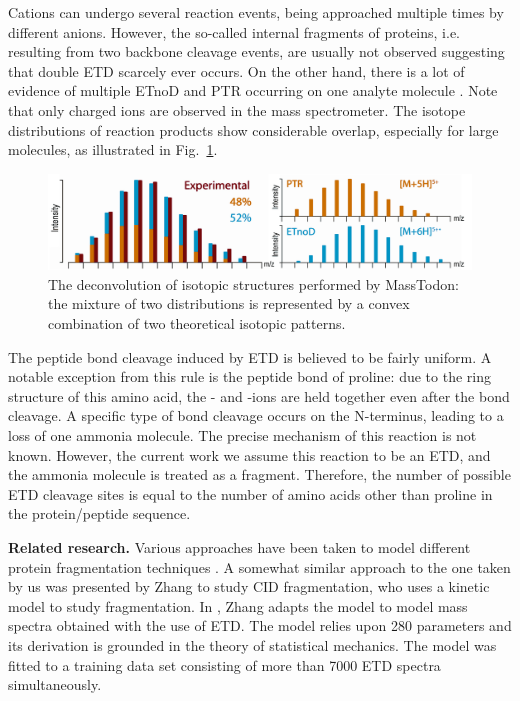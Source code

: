 \documentclass{llncs}
\begin{document}
Cations can undergo several reaction events, being approached multiple times by different anions. However, the so-called internal fragments of proteins, i.e. resulting from two backbone cleavage events, are usually not observed suggesting that double ETD scarcely ever occurs. On the other hand, there is a lot of evidence of multiple ETnoD and PTR occurring on one analyte molecule  \cite{Lermyte2015-li}. Note that only charged ions are observed in the mass spectrometer. The isotope distributions of reaction products show considerable overlap, especially for large molecules, as illustrated in Fig.~\ref{fig::massTodon}.
\begin{figure}[h]\centering
        \includegraphics[width=.8\textwidth]{masstodon.png}
        \caption{The deconvolution of isotopic structures performed by {\sc MassTodon}: the mixture of two distributions is represented by a convex combination of two theoretical isotopic patterns.}\label{fig::massTodon}
\end{figure}


The peptide bond cleavage induced by ETD is believed to be fairly uniform. A notable exception from this rule is the peptide bond of proline: due to the ring structure of this amino acid, the - and -ions are held together even after the  bond cleavage. A specific type of  bond cleavage occurs on the N-terminus, leading to a loss of one ammonia molecule. The precise mechanism of this reaction is not known. However, the current work we assume this reaction to be an ETD, and the ammonia molecule is treated as a  fragment. Therefore, the number of possible ETD cleavage sites is equal to the number of amino acids other than proline in the protein/peptide sequence.

\textbf{Related research.}
Various approaches have been taken to model different protein fragmentation techniques \cite{Breuker2004-az,Simons2010-gy,Zhurov2013-ua,Turecek2013-fq}. A somewhat similar approach to the one taken by us was presented by Zhang \cite{Zhang2004-fp,Zhang2005-jn} to study CID fragmentation, who uses a kinetic model to study fragmentation.
In \cite{Zhang2010-fp}, Zhang adapts the model to model mass spectra obtained with the use of ETD. The model relies upon 280 parameters and its derivation is grounded in the theory of statistical mechanics. The model was fitted to a training data set consisting of more than 7000 ETD spectra simultaneously.
\end{document}

